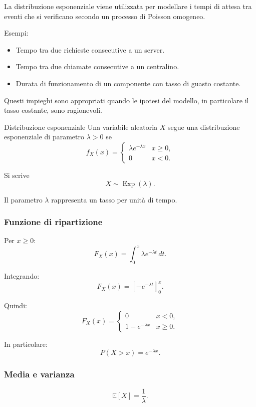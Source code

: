La distribuzione esponenziale
viene utilizzata per modellare
i tempi di attesa tra eventi
che si verificano secondo
un processo di Poisson omogeneo.

Esempi:
\begin{itemize}
    \item Tempo tra due richieste
    consecutive a un server.
    \item Tempo tra due chiamate
    consecutive a un centralino.
    \item Durata di funzionamento
    di un componente con tasso
    di guasto costante.
\end{itemize}

Questi impieghi sono appropriati
quando le ipotesi del modello,
in particolare il tasso costante,
sono ragionevoli.

\begin{definition}{Distribuzione esponenziale}
Una variabile aleatoria $X$
segue una distribuzione esponenziale
di parametro $\lambda>0$ se
\[
\boxed{
f_X(x)=
\begin{cases}
\lambda e^{-\lambda x} & x\geq0,\\
0 & x<0.
\end{cases}
}
\]

Si scrive
\[
X\sim\operatorname{Exp}(\lambda).
\]

Il parametro $\lambda$ rappresenta
un tasso per unità di tempo.
\end{definition}

\subsubsection{Funzione di ripartizione}

Per $x\geq0$:
\[
F_X(x)
=
\int_0^x\lambda e^{-\lambda t}\,dt.
\]

Integrando:
\[
F_X(x)
=
[-e^{-\lambda t}]_0^x.
\]

Quindi:
\[
\boxed{
F_X(x)=
\begin{cases}
0 & x<0,\\
1-e^{-\lambda x} & x\geq0.
\end{cases}
}
\]

In particolare:
\[
\boxed{
P(X>x)=e^{-\lambda x}.
}
\]

\subsubsection{Media e varianza}

\[
\boxed{
\mathbb{E}[X]=\frac1\lambda.
}
\]

